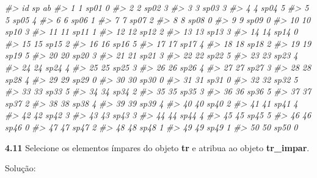 \documentclass[
]{book}
\newenvironment{Shaded}{\begin{snugshade}}{\end{snugshade}}
\newcommand{\CommentTok}[1]{\textcolor[rgb]{0.56,0.35,0.01}{\textit{#1}}}
\begin{document}
\begin{Shaded}
\begin{Highlighting}[]
\CommentTok{\#\textgreater{}    id   sp ab}
\CommentTok{\#\textgreater{} 1   1 sp01  0}
\CommentTok{\#\textgreater{} 2   2 sp02  3}
\CommentTok{\#\textgreater{} 3   3 sp03  3}
\CommentTok{\#\textgreater{} 4   4 sp04  5}
\CommentTok{\#\textgreater{} 5   5 sp05  4}
\CommentTok{\#\textgreater{} 6   6 sp06  1}
\CommentTok{\#\textgreater{} 7   7 sp07  2}
\CommentTok{\#\textgreater{} 8   8 sp08  0}
\CommentTok{\#\textgreater{} 9   9 sp09  0}
\CommentTok{\#\textgreater{} 10 10 sp10  3}
\CommentTok{\#\textgreater{} 11 11 sp11  1}
\CommentTok{\#\textgreater{} 12 12 sp12  2}
\CommentTok{\#\textgreater{} 13 13 sp13  3}
\CommentTok{\#\textgreater{} 14 14 sp14  0}
\CommentTok{\#\textgreater{} 15 15 sp15  2}
\CommentTok{\#\textgreater{} 16 16 sp16  5}
\CommentTok{\#\textgreater{} 17 17 sp17  4}
\CommentTok{\#\textgreater{} 18 18 sp18  2}
\CommentTok{\#\textgreater{} 19 19 sp19  5}
\CommentTok{\#\textgreater{} 20 20 sp20  3}
\CommentTok{\#\textgreater{} 21 21 sp21  3}
\CommentTok{\#\textgreater{} 22 22 sp22  5}
\CommentTok{\#\textgreater{} 23 23 sp23  4}
\CommentTok{\#\textgreater{} 24 24 sp24  4}
\CommentTok{\#\textgreater{} 25 25 sp25  3}
\CommentTok{\#\textgreater{} 26 26 sp26  4}
\CommentTok{\#\textgreater{} 27 27 sp27  3}
\CommentTok{\#\textgreater{} 28 28 sp28  4}
\CommentTok{\#\textgreater{} 29 29 sp29  0}
\CommentTok{\#\textgreater{} 30 30 sp30  0}
\CommentTok{\#\textgreater{} 31 31 sp31  0}
\CommentTok{\#\textgreater{} 32 32 sp32  5}
\CommentTok{\#\textgreater{} 33 33 sp33  5}
\CommentTok{\#\textgreater{} 34 34 sp34  2}
\CommentTok{\#\textgreater{} 35 35 sp35  3}
\CommentTok{\#\textgreater{} 36 36 sp36  5}
\CommentTok{\#\textgreater{} 37 37 sp37  2}
\CommentTok{\#\textgreater{} 38 38 sp38  4}
\CommentTok{\#\textgreater{} 39 39 sp39  4}
\CommentTok{\#\textgreater{} 40 40 sp40  2}
\CommentTok{\#\textgreater{} 41 41 sp41  4}
\CommentTok{\#\textgreater{} 42 42 sp42  3}
\CommentTok{\#\textgreater{} 43 43 sp43  3}
\CommentTok{\#\textgreater{} 44 44 sp44  4}
\CommentTok{\#\textgreater{} 45 45 sp45  5}
\CommentTok{\#\textgreater{} 46 46 sp46  0}
\CommentTok{\#\textgreater{} 47 47 sp47  2}
\CommentTok{\#\textgreater{} 48 48 sp48  1}
\CommentTok{\#\textgreater{} 49 49 sp49  1}
\CommentTok{\#\textgreater{} 50 50 sp50  0}
\end{Highlighting}
\end{Shaded}

\textbf{4.11}
Selecione os elementos ímpares do objeto \textbf{tr} e atribua ao objeto \textbf{tr\_impar}.

Solução:
\end{document}
